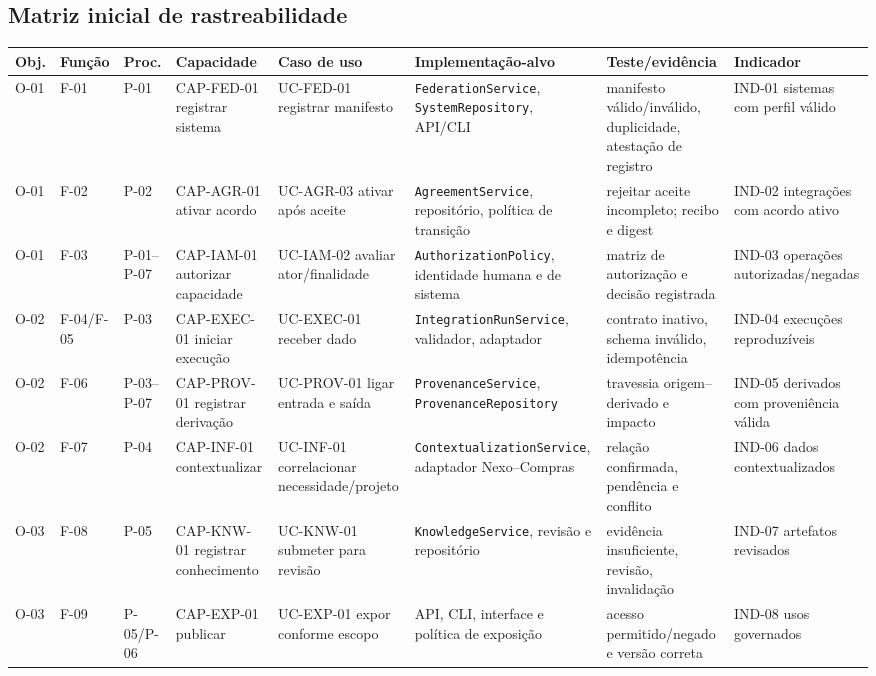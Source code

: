 \documentclass[11pt,a4paper,oneside]{article}
\begin{document}
\subsection{Matriz inicial de rastreabilidade}
\begin{landscape}
\scriptsize
\begin{longtable}{P{1.3cm}P{1.3cm}P{1.3cm}P{3.4cm}P{3.5cm}P{3.8cm}P{3.6cm}P{3.0cm}}
\toprule
\textbf{Obj.} & \textbf{Função} & \textbf{Proc.} & \textbf{Capacidade} & \textbf{Caso de uso} & \textbf{Implementação-alvo} & \textbf{Teste/evidência} & \textbf{Indicador} \\
\midrule
\endhead
O-01 & F-01 & P-01 & CAP-FED-01 registrar sistema & UC-FED-01 registrar manifesto & \texttt{FederationService}, \texttt{SystemRepository}, API/CLI & manifesto válido/inválido, duplicidade, atestação de registro & IND-01 sistemas com perfil válido \\
O-01 & F-02 & P-02 & CAP-AGR-01 ativar acordo & UC-AGR-03 ativar após aceite & \texttt{AgreementService}, repositório, política de transição & rejeitar aceite incompleto; recibo e digest & IND-02 integrações com acordo ativo \\
O-01 & F-03 & P-01--P-07 & CAP-IAM-01 autorizar capacidade & UC-IAM-02 avaliar ator/finalidade & \texttt{AuthorizationPolicy}, identidade humana e de sistema & matriz de autorização e decisão registrada & IND-03 operações autorizadas/negadas \\
O-02 & F-04/F-05 & P-03 & CAP-EXEC-01 iniciar execução & UC-EXEC-01 receber dado & \texttt{IntegrationRunService}, validador, adaptador & contrato inativo, schema inválido, idempotência & IND-04 execuções reproduzíveis \\
O-02 & F-06 & P-03--P-07 & CAP-PROV-01 registrar derivação & UC-PROV-01 ligar entrada e saída & \texttt{ProvenanceService}, \texttt{ProvenanceRepository} & travessia origem--derivado e impacto & IND-05 derivados com proveniência válida \\
O-02 & F-07 & P-04 & CAP-INF-01 contextualizar & UC-INF-01 correlacionar necessidade/projeto & \texttt{ContextualizationService}, adaptador Nexo--Compras & relação confirmada, pendência e conflito & IND-06 dados contextualizados \\
O-03 & F-08 & P-05 & CAP-KNW-01 registrar conhecimento & UC-KNW-01 submeter para revisão & \texttt{KnowledgeService}, revisão e repositório & evidência insuficiente, revisão, invalidação & IND-07 artefatos revisados \\
O-03 & F-09 & P-05/P-06 & CAP-EXP-01 publicar & UC-EXP-01 expor conforme escopo & API, CLI, interface e política de exposição & acesso permitido/negado e versão correta & IND-08 usos governados \\

\end{longtable}
\end{landscape}
\end{document}
